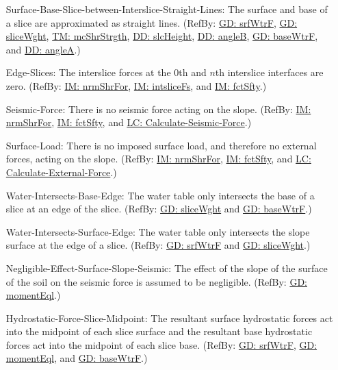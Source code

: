 \documentclass[12pt]{article}
\begin{document}
\begin{itemize}
\item[Surface-Base-Slice-between-Interslice-Straight-Lines:\phantomsection\label{assumpSBSBISL}]{The surface and base of a slice are approximated as straight lines. (RefBy: \hyperref[GD:srfWtrF]{GD: srfWtrF}, \hyperref[GD:sliceWght]{GD: sliceWght}, \hyperref[TM:mcShrStrgth]{TM: mcShrStrgth}, \hyperref[DD:slcHeight]{DD: slcHeight}, \hyperref[DD:angleB]{DD: angleB}, \hyperref[GD:baseWtrF]{GD: baseWtrF}, and \hyperref[DD:angleA]{DD: angleA}.)}
\item[Edge-Slices:\phantomsection\label{assumpES}]{The interslice forces at the 0th and $n$th interslice interfaces are zero. (RefBy: \hyperref[IM:nrmShrFor]{IM: nrmShrFor}, \hyperref[IM:intsliceFs]{IM: intsliceFs}, and \hyperref[IM:fctSfty]{IM: fctSfty}.)}
\item[Seismic-Force:\phantomsection\label{assumpSF}]{There is no seismic force acting on the slope. (RefBy: \hyperref[IM:nrmShrFor]{IM: nrmShrFor}, \hyperref[IM:fctSfty]{IM: fctSfty}, and \hyperref[LC_seismic]{LC: Calculate-Seismic-Force}.)}
\item[Surface-Load:\phantomsection\label{assumpSL}]{There is no imposed surface load, and therefore no external forces, acting on the slope. (RefBy: \hyperref[IM:nrmShrFor]{IM: nrmShrFor}, \hyperref[IM:fctSfty]{IM: fctSfty}, and \hyperref[LC_external]{LC: Calculate-External-Force}.)}
\item[Water-Intersects-Base-Edge:\phantomsection\label{assumpWIBE}]{The water table only intersects the base of a slice at an edge of the slice. (RefBy: \hyperref[GD:sliceWght]{GD: sliceWght} and \hyperref[GD:baseWtrF]{GD: baseWtrF}.)}
\item[Water-Intersects-Surface-Edge:\phantomsection\label{assumpWISE}]{The water table only intersects the slope surface at the edge of a slice. (RefBy: \hyperref[GD:srfWtrF]{GD: srfWtrF} and \hyperref[GD:sliceWght]{GD: sliceWght}.)}
\item[Negligible-Effect-Surface-Slope-Seismic:\phantomsection\label{assumpNESSS}]{The effect of the slope of the surface of the soil on the seismic force is assumed to be negligible. (RefBy: \hyperref[GD:momentEql]{GD: momentEql}.)}
\item[Hydrostatic-Force-Slice-Midpoint:\phantomsection\label{assumpHFSM}]{The resultant surface hydrostatic forces act into the midpoint of each slice surface and the resultant base hydrostatic forces act into the midpoint of each slice base. (RefBy: \hyperref[GD:srfWtrF]{GD: srfWtrF}, \hyperref[GD:momentEql]{GD: momentEql}, and \hyperref[GD:baseWtrF]{GD: baseWtrF}.)}
\end{itemize}
\end{document}
